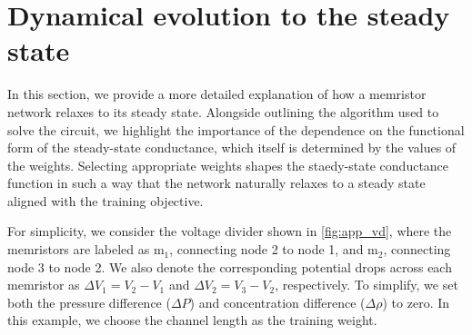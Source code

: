 \documentclass[reprint,superscriptaddress,prb,showkeys]{revtex4-2}
\newcommand{\m}{\text{m}} %
\begin{document}
\cleardoublepage
\appendix

\section{Dynamical evolution to the steady state \label{app:dyn_evol_steady_state}}

In this section, we provide a more detailed explanation of how a memristor network relaxes to its steady state. Alongside outlining the algorithm used to solve the circuit, we highlight the importance of the dependence on the functional form of the steady-state conductance, which itself is determined by the values of the weights. Selecting appropriate weights shapes the  staedy-state conductance function in such a way that the network naturally relaxes to a steady state aligned with the training objective.

For simplicity, we consider the voltage divider shown in \cref{fig:app_vd}, where the memristors are labeled as $ \m_1 $, connecting node 2 to node 1, and $ \m_2 $, connecting node 3 to node 2. We also denote the corresponding potential drops across each memristor as $ \Delta V_1 = V_2 - V_1$ and $ \Delta V_2  = V_3 - V_2$, respectively. To simplify, we set both the pressure difference ($ \Delta P $) and concentration difference ($ \Delta \rho $) to zero. In this example, we choose the channel length as the training weight.
\end{document}
